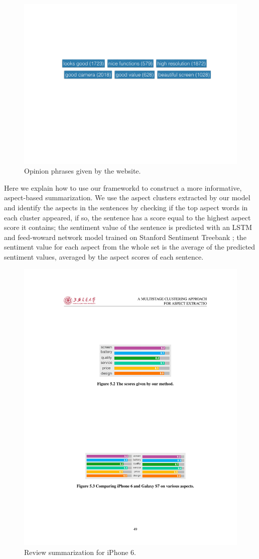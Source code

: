 \begin{figure}[h!]
\centering
\includegraphics[width=0.7\columnwidth]{figures/experiments/opinion_phrases}
\caption{Opinion phrases given by the website.}
\label{fig:experiments:opinion_phrases}
\end{figure}

Here we explain how to use our frameworkd to construct a more informative, aspect-based summarization. We use the aspect clusters extracted by our model and identify the aspects in the sentences by checking if the top aspect words in each cluster appeared, if so, the sentence has a score equal to the highest aspect score it contains; the sentiment value of the sentence is predicted with an LSTM and feed-woward network model trained on Stanford Sentiment Treebank \cite{socher2013recursive}; the sentiment value for each aspect from the whole set is the average of the predicted sentiment values, averaged by the aspect scores of each sentence. 

\begin{figure}[t!]
\centering
\includegraphics[width=0.5\columnwidth]{figures/experiments/scores}
\caption{Review summarization for iPhone 6.}
\label{fig:experiments:scores}
\end{figure}

